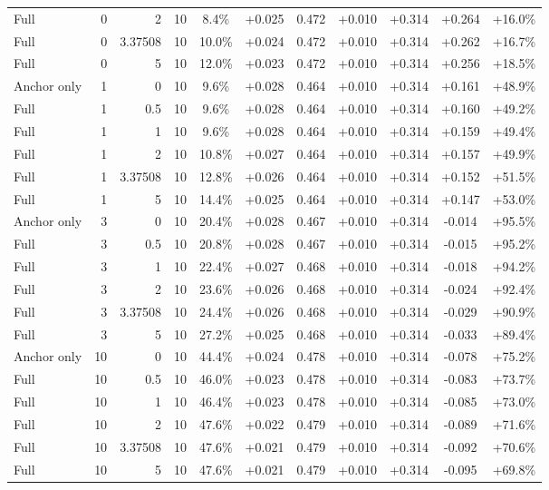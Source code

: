 \begin{table}[htbp]
\begin{tabular}{lrrrccccccc}
Full & 0 & 2 & 10 & 8.4\% & +0.025 & 0.472 & +0.010 & +0.314 & +0.264 & +16.0\% \\
Full & 0 & 3.37508 & 10 & 10.0\% & +0.024 & 0.472 & +0.010 & +0.314 & +0.262 & +16.7\% \\
Full & 0 & 5 & 10 & 12.0\% & +0.023 & 0.472 & +0.010 & +0.314 & +0.256 & +18.5\% \\
Anchor only & 1 & 0 & 10 & 9.6\% & +0.028 & 0.464 & +0.010 & +0.314 & +0.161 & +48.9\% \\
Full & 1 & 0.5 & 10 & 9.6\% & +0.028 & 0.464 & +0.010 & +0.314 & +0.160 & +49.2\% \\
Full & 1 & 1 & 10 & 9.6\% & +0.028 & 0.464 & +0.010 & +0.314 & +0.159 & +49.4\% \\
Full & 1 & 2 & 10 & 10.8\% & +0.027 & 0.464 & +0.010 & +0.314 & +0.157 & +49.9\% \\
Full & 1 & 3.37508 & 10 & 12.8\% & +0.026 & 0.464 & +0.010 & +0.314 & +0.152 & +51.5\% \\
Full & 1 & 5 & 10 & 14.4\% & +0.025 & 0.464 & +0.010 & +0.314 & +0.147 & +53.0\% \\
Anchor only & 3 & 0 & 10 & 20.4\% & +0.028 & 0.467 & +0.010 & +0.314 & -0.014 & +95.5\% \\
Full & 3 & 0.5 & 10 & 20.8\% & +0.028 & 0.467 & +0.010 & +0.314 & -0.015 & +95.2\% \\
Full & 3 & 1 & 10 & 22.4\% & +0.027 & 0.468 & +0.010 & +0.314 & -0.018 & +94.2\% \\
Full & 3 & 2 & 10 & 23.6\% & +0.026 & 0.468 & +0.010 & +0.314 & -0.024 & +92.4\% \\
Full & 3 & 3.37508 & 10 & 24.4\% & +0.026 & 0.468 & +0.010 & +0.314 & -0.029 & +90.9\% \\
Full & 3 & 5 & 10 & 27.2\% & +0.025 & 0.468 & +0.010 & +0.314 & -0.033 & +89.4\% \\
Anchor only & 10 & 0 & 10 & 44.4\% & +0.024 & 0.478 & +0.010 & +0.314 & -0.078 & +75.2\% \\
Full & 10 & 0.5 & 10 & 46.0\% & +0.023 & 0.478 & +0.010 & +0.314 & -0.083 & +73.7\% \\
Full & 10 & 1 & 10 & 46.4\% & +0.023 & 0.478 & +0.010 & +0.314 & -0.085 & +73.0\% \\
Full & 10 & 2 & 10 & 47.6\% & +0.022 & 0.479 & +0.010 & +0.314 & -0.089 & +71.6\% \\
Full & 10 & 3.37508 & 10 & 47.6\% & +0.021 & 0.479 & +0.010 & +0.314 & -0.092 & +70.6\% \\
Full & 10 & 5 & 10 & 47.6\% & +0.021 & 0.479 & +0.010 & +0.314 & -0.095 & +69.8\% \\

\end{tabular}
\end{table}
